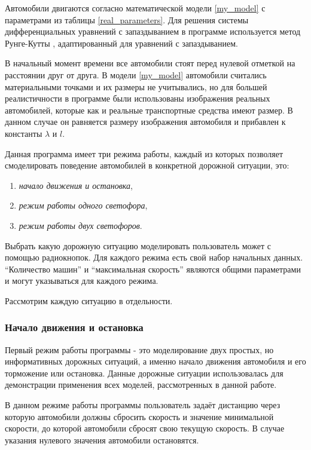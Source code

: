 \documentclass[12pt, a4paper]{extarticle}
\numberwithin{equation}{section}
\numberwithin{figure}{section}
\begin{document}
Автомобили двигаются согласно математической модели \eqref{my_model} с параметрами из таблицы \ref{real_parameters}. Для решения системы дифференциальных уравнений с запаздыванием в программе используется метод Рунге-Кутты \cite{Runge_Kutta}, адаптированный для уравнений с запаздыванием.

В начальный момент времени все автомобили стоят перед нулевой отметкой на расстоянии друг от друга. В модели \eqref{my_model} автомобили считались материальными точками и их размеры не учитывались, но для большей реалистичности в программе были использованы изображения реальных автомобилей, которые как и реальные транспортные средства имеют размер. В данном случае он  равняется размеру изображения автомобиля и прибавлен к константы $\lambda$ и $l$.

Данная программа имеет три режима работы, каждый из которых позволяет смоделировать поведение автомобилей в конкретной дорожной ситуации, это:

\begin{enumerate}[parsep=5pt] 
	\item \textit{начало движения и остановка},
	\item \textit{режим работы одного светофора},
	\item \textit{режим работы двух светофоров}.
\end{enumerate}

Выбрать какую дорожную ситуацию моделировать пользователь может с помощью радиокнопок. Для каждого режима есть свой набор начальных данных. ``Количество машин'' и ``максимальная скорость'' являются общими параметрами и могут указываться для каждого режима.

Рассмотрим каждую ситуацию в отдельности.

\subsubsection{Начало движения и остановка}

Первый режим работы программы - это моделирование двух простых, но информативных дорожных ситуаций, а именно начало движения автомобиля и его торможение или остановка. Данные дорожные ситуации использовалась для демонстрации применения всех моделей, рассмотренных в данной работе.

В данном режиме работы программы пользователь задаёт дистанцию через которую автомобили должны сбросить скорость и значение минимальной скорости, до которой автомобили сбросят свою текущую скорость. В случае указания нулевого значения автомобили остановятся.
\end{document}
